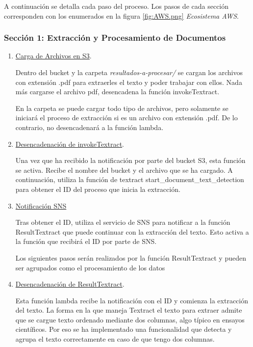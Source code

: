 A continuación se detalla cada paso del proceso. Los pasos de cada sección corresponden con los enumerados en la figura \ref{fig:AWS.png} \textit{Ecosistema AWS}.

\subsubsection{Sección 1: Extracción y Procesamiento de Documentos}

\begin{enumerate}
    \item \underline{Carga de Archivos en S3}. 
    
    Dentro del bucket y la carpeta \textit{resultados-a-procesar/} se cargan los archivos con extensión .pdf para extraerles el texto y poder trabajar con ellos. Nada más cargarse el archivo pdf, desencadena la función invokeTextract. 

    En la carpeta se puede cargar todo tipo de archivos, pero solamente se iniciará el proceso de extracción si es un archivo con extensión .pdf. De lo contrario, no desencadenará a la función lambda.
    
    \item \underline{Desencadenación de invokeTextract}. 
    
    Una vez que ha recibido la notificación por parte del bucket S3, esta función se activa. Recibe el nombre del bucket y el archivo que se ha cargado. A continuación, utiliza la función de textract start\_document\_text\_detection para obtener el ID del proceso que inicia la extracción. 

    \item \underline{Notificación SNS}
    
    Tras obtener el ID, utiliza el servicio de SNS para notificar a la función ResultTextract que puede continuar con la extracción del texto. Esto activa a la función que recibirá el ID por parte de SNS.

    Los siguientes pasos serán realizados por la función ResultTextract y pueden ser agrupados como el procesamiento de los datos

    \item \underline{Desencadenación de ResultTextract}.

    Esta función lambda recibe la notificación con el ID y comienza la extracción del texto. La forma en la que maneja Textract el texto para extraer admite que se cargue texto ordenado mediante dos columnas, algo típico en ensayos científicos. Por eso se ha implementado una funcionalidad que detecta y agrupa el texto correctamente en caso de que tengo dos columnas. 


\end{enumerate}
